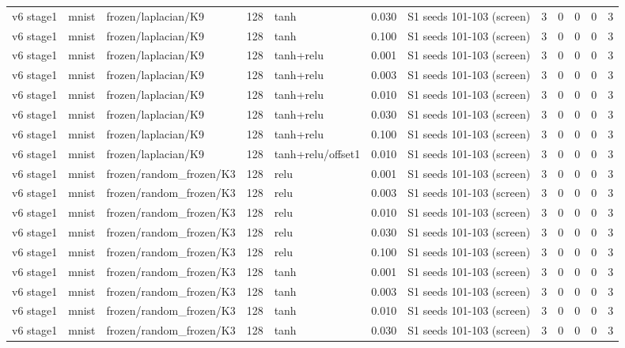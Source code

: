 \begin{table}[htbp]
{\begin{tabular}{@{}lllrlrlrrrrr@{}}
v6 stage1 & mnist & frozen/laplacian/K9 & 128 & tanh & 0.030 & S1 seeds 101-103 (screen) & 3 & 0 & 0 & 0 & 3 \\
v6 stage1 & mnist & frozen/laplacian/K9 & 128 & tanh & 0.100 & S1 seeds 101-103 (screen) & 3 & 0 & 0 & 0 & 3 \\
v6 stage1 & mnist & frozen/laplacian/K9 & 128 & tanh+relu & 0.001 & S1 seeds 101-103 (screen) & 3 & 0 & 0 & 0 & 3 \\
v6 stage1 & mnist & frozen/laplacian/K9 & 128 & tanh+relu & 0.003 & S1 seeds 101-103 (screen) & 3 & 0 & 0 & 0 & 3 \\
v6 stage1 & mnist & frozen/laplacian/K9 & 128 & tanh+relu & 0.010 & S1 seeds 101-103 (screen) & 3 & 0 & 0 & 0 & 3 \\
v6 stage1 & mnist & frozen/laplacian/K9 & 128 & tanh+relu & 0.030 & S1 seeds 101-103 (screen) & 3 & 0 & 0 & 0 & 3 \\
v6 stage1 & mnist & frozen/laplacian/K9 & 128 & tanh+relu & 0.100 & S1 seeds 101-103 (screen) & 3 & 0 & 0 & 0 & 3 \\
v6 stage1 & mnist & frozen/laplacian/K9 & 128 & tanh+relu/offset1 & 0.010 & S1 seeds 101-103 (screen) & 3 & 0 & 0 & 0 & 3 \\
v6 stage1 & mnist & frozen/random\_frozen/K3 & 128 & relu & 0.001 & S1 seeds 101-103 (screen) & 3 & 0 & 0 & 0 & 3 \\
v6 stage1 & mnist & frozen/random\_frozen/K3 & 128 & relu & 0.003 & S1 seeds 101-103 (screen) & 3 & 0 & 0 & 0 & 3 \\
v6 stage1 & mnist & frozen/random\_frozen/K3 & 128 & relu & 0.010 & S1 seeds 101-103 (screen) & 3 & 0 & 0 & 0 & 3 \\
v6 stage1 & mnist & frozen/random\_frozen/K3 & 128 & relu & 0.030 & S1 seeds 101-103 (screen) & 3 & 0 & 0 & 0 & 3 \\
v6 stage1 & mnist & frozen/random\_frozen/K3 & 128 & relu & 0.100 & S1 seeds 101-103 (screen) & 3 & 0 & 0 & 0 & 3 \\
v6 stage1 & mnist & frozen/random\_frozen/K3 & 128 & tanh & 0.001 & S1 seeds 101-103 (screen) & 3 & 0 & 0 & 0 & 3 \\
v6 stage1 & mnist & frozen/random\_frozen/K3 & 128 & tanh & 0.003 & S1 seeds 101-103 (screen) & 3 & 0 & 0 & 0 & 3 \\
v6 stage1 & mnist & frozen/random\_frozen/K3 & 128 & tanh & 0.010 & S1 seeds 101-103 (screen) & 3 & 0 & 0 & 0 & 3 \\
v6 stage1 & mnist & frozen/random\_frozen/K3 & 128 & tanh & 0.030 & S1 seeds 101-103 (screen) & 3 & 0 & 0 & 0 & 3 \\

\end{tabular}}
\end{table}
